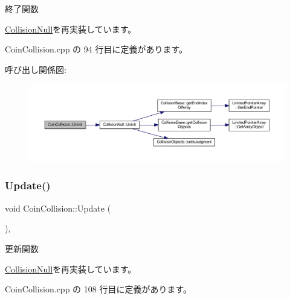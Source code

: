 終了関数 



\mbox{\hyperlink{class_collision_null_a7c6d0ec502efc55e2f406415451152f5}{Collision\+Null}}を再実装しています。



 Coin\+Collision.\+cpp の 94 行目に定義があります。

呼び出し関係図\+:\nopagebreak
\begin{figure}[H]
\begin{center}
\leavevmode
\includegraphics[width=350pt]{class_coin_collision_aa852afdcdbedcf82809df9c7fd99be9e_cgraph}
\end{center}
\end{figure}
\mbox{\label{class_coin_collision_a981fd9b1b8c688a757a456a56d80501b}} 
\subsubsection{\texorpdfstring{Update()}{Update()}}
{\footnotesize\ttfamily void Coin\+Collision\+::\+Update (\begin{DoxyParamCaption}{ }\end{DoxyParamCaption})\hspace{0.3cm}{\ttfamily [override]}, {\ttfamily [virtual]}}



更新関数 



\mbox{\hyperlink{class_collision_null_a5e5e094e3fbe3ccc0515e485c739bd15}{Collision\+Null}}を再実装しています。



 Coin\+Collision.\+cpp の 108 行目に定義があります。

